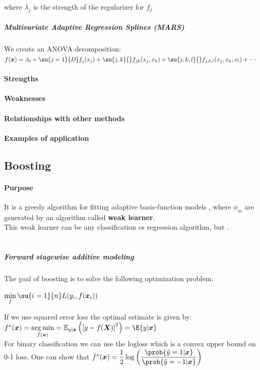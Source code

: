  where $\lambda_{j}$ is the strength of the regularizer for $f_{j}$
\subparagraph{Multivariate Adaptive Regression Splines (MARS)}
We create an ANOVA decomposition:
$f(\bm{x}) = \beta_{0} + \su{j=1}{D}f_{j}(x_{j}) + \su{j,k}{}f_{jk}(x_{j},x_{k}) + 
\su{j,k,l}{}f_{j,k,l}(x_{j}, x_{k}, x_{l}) + \cdots$
\paragraph{Strengths}
\paragraph{Weaknesses}
\paragraph{Relationships with other methods}
\paragraph{Examples of application}

\subsection{Boosting}
\paragraph{Purpose}
It is a greedy algorithm for fitting adaptive basis-function models , where $\phi_{m}$ are generated by an
algorithm called \textbf{weak learner}. \\
This weak learner can be any classification or regression algorithm, but .\\
\\
\subparagraph{Forward stagewise additive modeling}
The goal of boosting is to solve the following optimization problem:
\begin{center}
    $\displaystyle\min_{f}\su{i=1}{n}L(y_{i},f(\bm{x}_{i}))$
\end{center}
If we use squared error loss the optimal estimate is given by: $f^{*}(\bm{x}) = \displaystyle
\argmin_{f(\bm{x})}=\mathbb{E}_{y|\bm{x}}\left(\left[y-f(\bm{X}) \right]^{2}\right) = \E{y|\bm{x}}$\\
For binary classification we can use the logloss which is a convex upper bound on 0-1 loss. One can
show that $f^{*}(\bm{x}) = \dfrac{1}{2}\log\left(\dfrac{\prob{\hat{y}=1|\bm{x}}}{\prob{\hat{y}=-1|
\bm{x}}}\right)$

